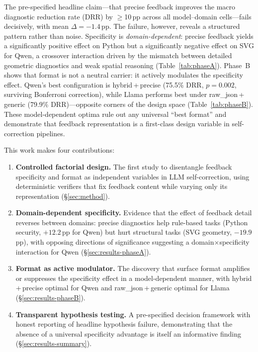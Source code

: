The pre-specified headline claim---that precise feedback improves the macro diagnostic reduction rate (DRR) by $\geq$10\,pp across all model--domain cells---fails decisively, with mean $\Delta = -1.4$\,pp.
The failure, however, reveals a structured pattern rather than noise.
Specificity is \emph{domain-dependent}: precise feedback yields a significantly positive effect on Python but a significantly negative effect on SVG for Qwen, a crossover interaction driven by the mismatch between detailed geometric diagnostics and weak spatial reasoning (Table~\ref{tab:phaseA}).
Phase~B shows that format is not a neutral carrier: it actively modulates the specificity effect.
Qwen's best configuration is hybrid\,+\,precise (75.5\% DRR, $p{=}0.002$, surviving Bonferroni correction), while Llama performs best under raw\_json\,+\,generic (79.9\% DRR)---opposite corners of the design space (Table~\ref{tab:phaseB}).
These model-dependent optima rule out any universal ``best format'' and demonstrate that feedback representation is a first-class design variable in self-correction pipelines.

This work makes four contributions:
\begin{enumerate}[leftmargin=*,itemsep=2pt]
\item \textbf{Controlled factorial design.} The first study to disentangle feedback specificity and format as independent variables in LLM self-correction, using deterministic verifiers that fix feedback content while varying only its representation (\S\ref{sec:method}).
\item \textbf{Domain-dependent specificity.} Evidence that the effect of feedback detail reverses between domains: precise diagnostics help rule-based tasks (Python security, $+12.2$\,pp for Qwen) but hurt structural tasks (SVG geometry, $-19.9$\,pp), with opposing directions of significance suggesting a domain$\times$specificity interaction for Qwen (\S\ref{sec:results-phaseA}).
\item \textbf{Format as active modulator.} The discovery that surface format amplifies or suppresses the specificity effect in a model-dependent manner, with hybrid\,+\,precise optimal for Qwen and raw\_json\,+\,generic optimal for Llama (\S\ref{sec:results-phaseB}).
\item \textbf{Transparent hypothesis testing.} A pre-specified decision framework with honest reporting of headline hypothesis failure, demonstrating that the absence of a universal specificity advantage is itself an informative finding (\S\ref{sec:results-summary}).
\end{enumerate}
